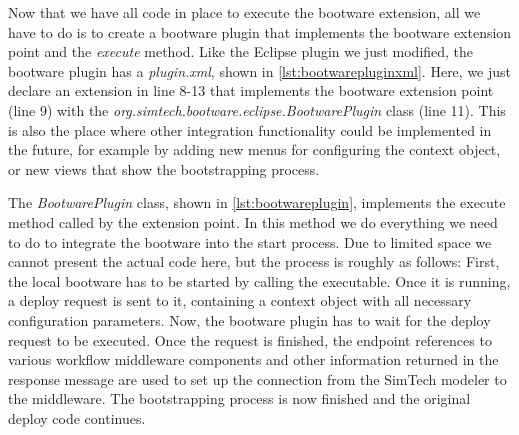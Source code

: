 
Now that we have all code in place to execute the bootware extension, all we have to do is to create a bootware plugin that implements the bootware extension point and the \textit{execute} method.
Like the Eclipse plugin we just modified, the bootware plugin has a \textit{plugin.xml}, shown in \autoref{lst:bootwarepluginxml}.
Here, we just declare an extension in line 8-13 that implements the bootware extension point (line 9) with the \textit{org.simtech.bootware.eclipse.BootwarePlugin} class (line 11).
This is also the place where other integration functionality could be implemented in the future, for example by adding new menus for configuring the context object, or new views that show the bootstrapping process.

\vspace*{\baselineskip}

The \textit{BootwarePlugin} class, shown in \autoref{lst:bootwareplugin}, implements the execute method called by the extension point.
In this method we do everything we need to do to integrate the bootware into the start process.
Due to limited space we cannot present the actual code here, but the process is roughly as follows:
First, the local bootware has to be started by calling the executable.
Once it is running, a deploy request is sent to it, containing a context object with all necessary configuration parameters.
Now, the bootware plugin has to wait for the deploy request to be executed.
Once the request is finished, the endpoint references to various workflow middleware components and other information returned in the response message are used to set up the connection from the SimTech modeler to the middleware.
The bootstrapping process is now finished and the original deploy code continues.

\vspace*{\baselineskip}
